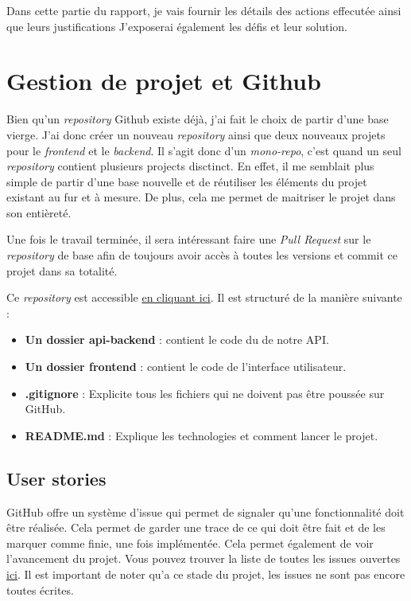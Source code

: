 Dans cette partie du rapport, je vais fournir les détails des actions effecutée ainsi que leurs justifications J'exposerai également les défis et leur solution.
\section{Gestion de projet et Github}
Bien qu'un \emph{repository} Github existe déjà, j'ai fait le choix de partir d'une base vierge. J'ai donc créer un nouveau \emph{repository} ainsi que deux nouveaux projets pour le \emph{frontend} et le \emph{backend}. Il s'agit donc d'un \emph{mono-repo}, c'est quand un seul \emph{repository} contient plusieurs projects disctinct. En effet, il me semblait plus simple de partir d'une base nouvelle et de réutiliser les éléments du projet existant au fur et à mesure. De plus, cela me permet de maitriser le projet dans son entièreté.

Une fois le travail terminée, il sera intéressant faire une \emph{Pull Request} sur le \emph{repository} de base afin de toujours avoir accès à toutes les versions et commit ce projet dans sa totalité.

Ce \emph{repository} est accessible \href{https://github.com/Marinlestylo/h-quiz}{en cliquant ici}. Il est structuré de la manière suivante :
\begin{itemize}
    \item \textbf{Un dossier api-backend} : contient le code du de notre API.
    \item \textbf{Un dossier frontend} : contient le code de l'interface utilisateur.
    \item \textbf{.gitignore} : Explicite tous les fichiers qui ne doivent pas être poussée sur GitHub.
    \item \textbf{README.md} : Explique les technologies et comment lancer le projet.
\end{itemize}

\subsection{User stories}
GitHub offre un système d'issue qui permet de signaler qu'une fonctionnalité doit être réalisée. Cela permet de garder une trace de ce qui doit être fait et de les marquer comme finie, une fois implémentée. Cela permet également de voir l'avancement du projet. Vous pouvez trouver la liste de toutes les issues ouvertes \href{https://github.com/Marinlestylo/h-quiz/issues}{ici}. Il est important de noter qu'a ce stade du projet, les issues ne sont pas encore toutes écrites.

